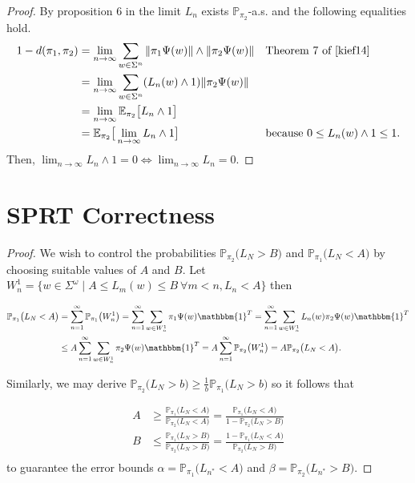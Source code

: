 \documentclass[a4paper,UKenglish,cleveref, autoref,mathscr]{lipics-v2019}
\newcommand{\EE}{\mathbb{E}}
\newcommand{\PP}{\mathbb{P}}
\newcommand{\1}{\mathbbm{1}}
\begin{document}


\appendix

\convergenceLn*

\begin{proof}
By proposition 6 in \cite{kief14} the limit $L_n$ exists $\PP_{\pi_2}$-a.s. and the following equalities hold. 
\begin{align*}
1 - d(\pi_1, \pi_2) & = \lim_{n \rightarrow \infty} \sum_{w \in \Sigma^n} \| \pi_1 \Psi(w) \| \land \| \pi_2 \Psi(w) \| && \text{Theorem 7 of \cite{kief14}}\\
& = \lim_{n \rightarrow \infty} \sum_{w \in \Sigma^n} (L_n(w) \land 1 ) \| \pi_2 \Psi(w)\| \\
& = \lim_{n \rightarrow \infty} \EE_{\pi_2} \big[ L_n \land 1  \big] \\
& = \EE_{\pi_2} \big[ \lim_{n \rightarrow \infty}  L_n \land 1  \big] && \text{because } 0 \leq L_n(w) \land 1 \leq 1.
\end{align*}
Then, $\lim_{n \rightarrow \infty}  L_n \land 1 = 0 \iff \lim_{n \rightarrow \infty}  L_n = 0$.
\end{proof}


\section{SPRT Correctness}

\sprtcorrectness*

\begin{proof}
We wish to control the probabilities $\PP_{\pi_2}\big( L_N > B\big)$ and $\PP_{\pi_1}\big( L_N < A\big)$ by choosing suitable values of $A$ and $B$. Let $W_n^1 = \{ w \in \Sigma^\omega \mid  A \leq L_m(w) \leq B ~\forall m < n, L_n < A\}$ then

\begin{align*}
\PP_{\pi_1}\big( L_N < A \big) & = \sum_{n = 1}^\infty \PP_{\pi_1}\big( W_n^1 \big) = \sum_{n = 1}^\infty \sum_{w \in W_n^1} \pi_1 \Psi(w) \1^T = \sum_{n = 1}^\infty \sum_{w \in W_n^1} L_n(w) \pi_2 \Psi(w) \1^T \\
& \leq A \sum_{n = 1}^\infty  \sum_{w \in W_n^1} \pi_2 \Psi(w) \1^T = A \sum_{n = 1}^\infty  \PP_{\pi_2}\big( W_n^1 \big) = A \PP_{\pi_2}\big( L_N < A \big). \\
\end{align*}

Similarly, we may derive $\PP_{\pi_2}\big( L_N > b \big) \geq \frac{1}{b} \PP_{\pi_1}\big( L_N > b\big)$ so it follows that

\begin{align*}
A & \geq \frac{\PP_{\pi_1}\big(  L_N < A\big)}{\PP_{\pi_2}\big(  L_N < A\big)} = \frac{\PP_{\pi_1}\big(  L_N < A\big)}{1 - \PP_{\pi_2}\big(  L_N > B\big)} \\
B & \leq \frac{\PP_{\pi_1}\big(  L_N > B\big)}{\PP_{\pi_2}\big(  L_{N} > B\big)} = \frac{1 - \PP_{\pi_1}\big( L_N < A\big)}{\PP_{\pi_2}\big(  L_N > B\big)}\\
\end{align*}
to guarantee the error bounds $\alpha = \PP_{\pi_1}\big( L_{n^*} < A\big)$ and $\beta = \PP_{\pi_2}\big( L_{n^*} > B\big)$.
\end{proof}
\end{document}
